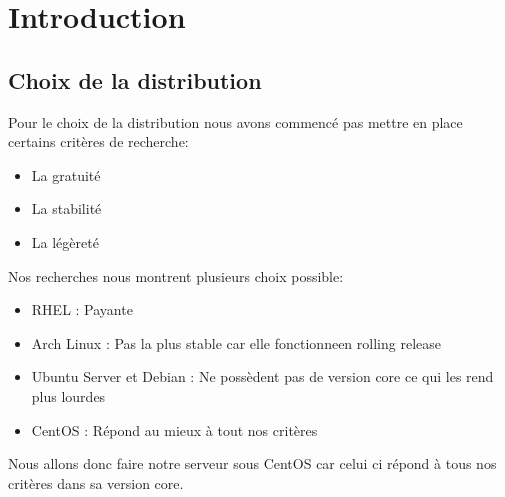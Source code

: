 \section{Introduction}
\subsection{Choix de la distribution}
Pour le choix de la distribution nous avons commencé pas mettre en place certains critères de recherche:
\begin{itemize}
	\item La gratuité
	\item La stabilité
	\item La légèreté
\end{itemize}
Nos recherches nous montrent plusieurs choix possible:
\begin{itemize}
	\item RHEL : Payante
	\item Arch Linux : Pas la plus stable car elle fonctionneen rolling release
	\item Ubuntu Server et Debian : Ne possèdent pas de version core ce qui les rend plus lourdes
	\item CentOS : Répond au mieux à tout nos critères
\end{itemize}
Nous allons donc faire notre serveur sous CentOS car celui ci répond à tous nos critères dans sa version core.


